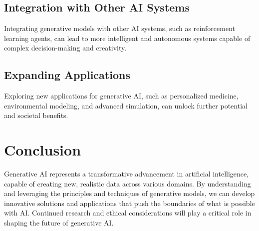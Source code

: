 \subsection{Integration with Other AI Systems}
Integrating generative models with other AI systems, such as reinforcement learning agents, can lead to more intelligent and autonomous systems capable of complex decision-making and creativity.

\subsection{Expanding Applications}
Exploring new applications for generative AI, such as personalized medicine, environmental modeling, and advanced simulation, can unlock further potential and societal benefits.

\section{Conclusion}
Generative AI represents a transformative advancement in artificial intelligence, capable of creating new, realistic data across various domains. By understanding and leveraging the principles and techniques of generative models, we can develop innovative solutions and applications that push the boundaries of what is possible with AI. Continued research and ethical considerations will play a critical role in shaping the future of generative AI.


